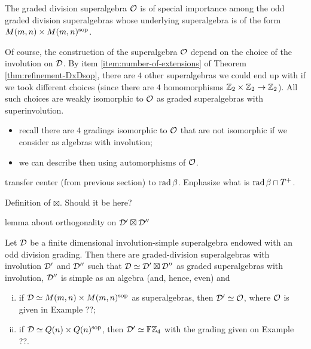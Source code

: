 The graded division superalgebra $\mathcal O$ is of special importance among the odd graded division superalgebras whose underlying superalgebra is of the form $M(m,n) \times M(m,n)^{\mathrm{sop}}$.

Of course, the construction of the superalgebra $\mathcal O$ depend on the choice of the involution on $\mathcal{D}$. 
By item \eqref{item:number-of-extensions} of Theorem \ref{thm:refinement-DxDsop}, there are $4$ other superalgebras we could end up with if we took different choices (since there are $4$ homomorphisms $\mathbb{Z}_2 \times \mathbb{Z}_2 \to \mathbb{Z}_2$). 
All such choices are weakly isomorphic to $\mathcal O$ as graded superalgebras with superinvolution.

\begin{itemize}
    \item recall there are $4$ gradings isomorphic to $\mathcal O$ that are not isomorphic if we consider as algebras with involution;
    \item we can describe then using automorphisms of $\mathcal O$.
\end{itemize}

\begin{lemma}
    transfer center (from previous section) to $\operatorname{rad} \beta$. 
    Enphasize what is $\operatorname{rad} \beta \cap T^+$.
\end{lemma}

\begin{defi}
    Definition of $\boxtimes$. Should it be here?
\end{defi}

\begin{lemma}
    lemma about orthogonality on $\mathcal{D}' \boxtimes \mathcal{D}''$
\end{lemma}

\begin{thm}
    Let $\mathcal{D}$ be a finite dimensional involution-simple superalgebra endowed with an odd division grading. 
    Then there are graded-division superalgebras with involution $\mathcal{D}'$ and $\mathcal{D}''$ such that $\mathcal{D} \simeq \mathcal{D}' \boxtimes \mathcal{D}''$ as graded superalgebras with involution, $\mathcal{D}''$ is simple as an algebra (and, hence, even) and
    \begin{enumerate}[(i)]
        \item if $\mathcal{D} \simeq M(m,n)\times M(m,n)^{\mathrm{sop}}$ as superalgebras, then $\mathcal{D}' \simeq \mathcal O$, where $\mathcal O$ is given in Example ??;
        \item if $\mathcal{D} \simeq Q(n)\times Q(n)^{\mathrm{sop}}$, then $\mathcal{D}' \simeq \mathbb{F}\mathbb{Z}_4$ with the grading given on Example ??.
    \end{enumerate}
\end{thm}

